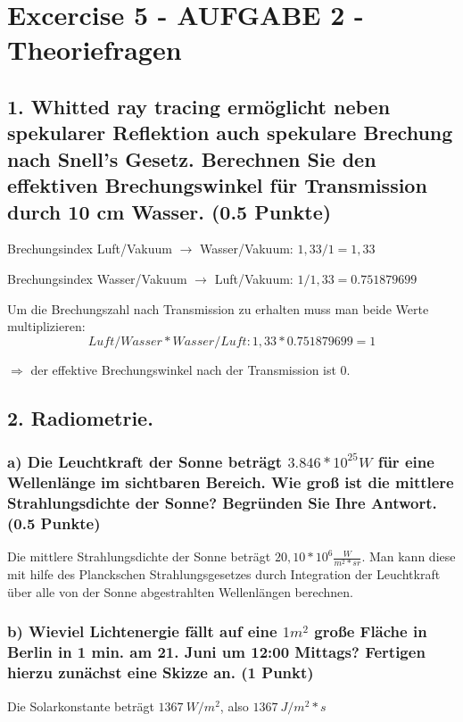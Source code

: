 \documentclass[12pt]{scrreprt}
\begin{document}


\chapter*{Excercise 5 - AUFGABE 2 - Theoriefragen}

\section*{1. Whitted ray tracing ermöglicht neben spekularer Reflektion auch spekulare Brechung nach Snell's Gesetz. Berechnen Sie den effektiven Brechungswinkel für Transmission durch 10 cm Wasser. (0.5 Punkte)}

Brechungsindex Luft/Vakuum $\rightarrow$ Wasser/Vakuum: $1,33 / 1 = 1,33$

Brechungsindex Wasser/Vakuum $\rightarrow$ Luft/Vakuum: $1 / 1,33 =  0.751879699$

Um die Brechungszahl nach Transmission zu erhalten muss man beide Werte multiplizieren: 
\[
	Luft/Wasser * Wasser/Luft: 1,33 * 0.751879699 = 1
\]

$\Rightarrow$ der effektive Brechungswinkel nach der Transmission ist 0.


\section*{2. Radiometrie.}

\subsection*{a) Die Leuchtkraft der Sonne beträgt $3.846 * 10^{25} W$ für eine Wellenlänge im sichtbaren Bereich. Wie groß ist die mittlere Strahlungsdichte der Sonne? Begründen Sie Ihre Antwort. (0.5 Punkte)}

Die mittlere Strahlungsdichte der Sonne beträgt $20,10 * 10^6 \frac{W}{m^2 * sr}$. Man kann diese mit hilfe des Planckschen Strahlungsgesetzes durch Integration der Leuchtkraft über alle von der Sonne abgestrahlten Wellenlängen berechnen.


\subsection*{b) Wieviel Lichtenergie fällt auf eine $1 m^2$ große Fläche in Berlin in 1 min. am 21. Juni um 12:00 Mittags? Fertigen hierzu zunächst eine Skizze an. (1 Punkt)}

Die Solarkonstante beträgt $1367~W/m^2$, also $1367~J/m^2 * s$
\end{document}
